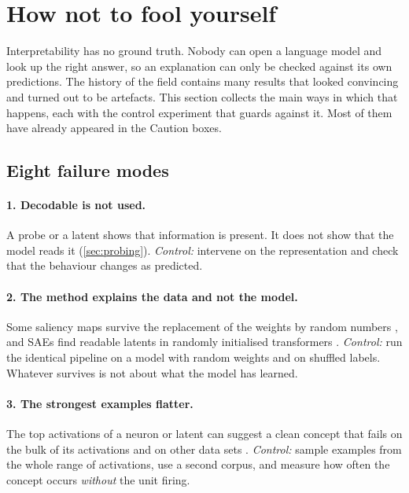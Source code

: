 \section{How not to fool yourself}
\label{sec:pitfalls}

Interpretability has no ground truth. Nobody can open a language model and look up the right answer, so an
explanation can only be checked against its own predictions. The history of the field contains many results
that looked convincing and turned out to be artefacts. This section collects the main ways in which that
happens, each with the control experiment that guards against it. Most of them have already appeared in the
Caution boxes.

\subsection{Eight failure modes}

\paragraph{1. Decodable is not used.} A probe or a latent shows that information is present. It does not show
that the model reads it (\cref{sec:probing}). \emph{Control:} intervene on the representation and check that the
behaviour changes as predicted.

\paragraph{2. The method explains the data and not the model.} Some saliency maps survive the replacement of
the weights by random numbers \citep{adebayo2018sanity}, and SAEs find readable latents in randomly initialised
transformers \citep{heap2025sparse}. \emph{Control:} run the identical pipeline on a model with random weights
and on shuffled labels. Whatever survives is not about what the model has learned.

\paragraph{3. The strongest examples flatter.} The top activations of a neuron or latent can suggest a clean
concept that fails on the bulk of its activations and on other data sets
\citep{bolukbasi2021interpretability}. \emph{Control:} sample examples from the whole range of activations, use
a second corpus, and measure how often the concept occurs \emph{without} the unit firing.

